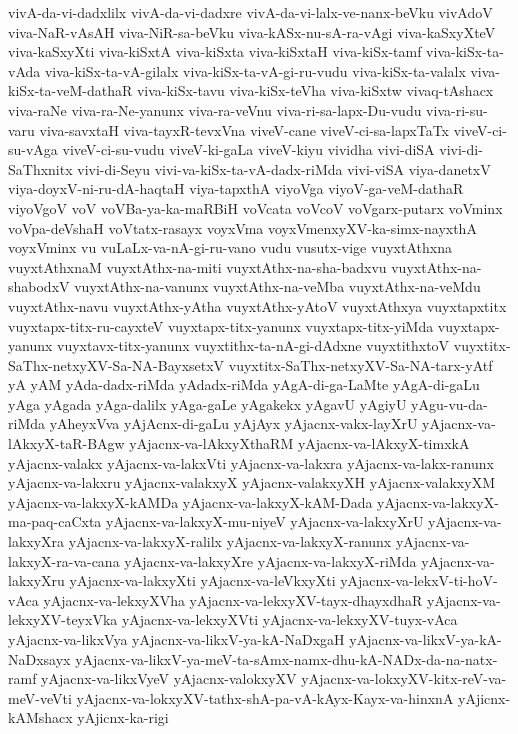 {vivA-da-vi-dadxlilx
vivA-da-vi-dadxre
vivA-da-vi-lalx-ve-nanx-beVku
vivAdoV
viva-NaR-vAsAH
viva-NiR-sa-beVku
viva-kASx-nu-sA-ra-vAgi
viva-kaSxyXteV
viva-kaSxyXti
viva-kiSxtA
viva-kiSxta
viva-kiSxtaH
viva-kiSx-tamf
viva-kiSx-ta-vAda
viva-kiSx-ta-vA-gilalx
viva-kiSx-ta-vA-gi-ru-vudu
viva-kiSx-ta-valalx
viva-kiSx-ta-veM-dathaR
viva-kiSx-tavu
viva-kiSx-teVha
viva-kiSxtw
vivaq-tAshacx
viva-raNe
viva-ra-Ne-yanunx
viva-ra-veVnu
viva-ri-sa-lapx-Du-vudu
viva-ri-su-varu
viva-savxtaH
viva-tayxR-tevxVna
viveV-cane
viveV-ci-sa-lapxTaTx
viveV-ci-su-vAga
viveV-ci-su-vudu
viveV-ki-gaLa
viveV-kiyu
vividha
vivi-diSA
vivi-di-SaThxnitx
vivi-di-Seyu
vivi-va-kiSx-ta-vA-dadx-riMda
vivi-viSA
viya-danetxV
viya-doyxV-ni-ru-dA-haqtaH
viya-tapxthA
viyoVga
viyoV-ga-veM-dathaR
viyoVgoV
voV
voVBa-ya-ka-maRBiH
voVcata
voVcoV
voVgarx-putarx
voVminx
voVpa-deVshaH
voVtatx-rasayx
voyxVma
voyxVmenxyXV-ka-simx-nayxthA
voyxVminx
vu
vuLaLx-va-nA-gi-ru-vano
vudu
vusutx-vige
vuyxtAthxna
vuyxtAthxnaM
vuyxtAthx-na-miti
vuyxtAthx-na-sha-badxvu
vuyxtAthx-na-shabodxV
vuyxtAthx-na-vanunx
vuyxtAthx-na-veMba
vuyxtAthx-na-veMdu
vuyxtAthx-navu
vuyxtAthx-yAtha
vuyxtAthx-yAtoV
vuyxtAthxya
vuyxtapxtitx
vuyxtapx-titx-ru-cayxteV
vuyxtapx-titx-yanunx
vuyxtapx-titx-yiMda
vuyxtapx-yanunx
vuyxtavx-titx-yanunx
vuyxtithx-ta-nA-gi-dAdxne
vuyxtithxtoV
vuyxtitx-SaThx-netxyXV-Sa-NA-BayxsetxV
vuyxtitx-SaThx-netxyXV-Sa-NA-tarx-yAtf
yA
yAM
yAda-dadx-riMda
yAdadx-riMda
yAgA-di-ga-LaMte
yAgA-di-gaLu
yAga
yAgada
yAga-dalilx
yAga-gaLe
yAgakekx
yAgavU
yAgiyU
yAgu-vu-da-riMda
yAheyxVva
yAjAcnx-di-gaLu
yAjAyx
yAjacnx-vakx-layXrU
yAjacnx-va-lAkxyX-taR-BAgw
yAjacnx-va-lAkxyXthaRM
yAjacnx-va-lAkxyX-timxkA
yAjacnx-valakx
yAjacnx-va-lakxVti
yAjacnx-va-lakxra
yAjacnx-va-lakx-ranunx
yAjacnx-va-lakxru
yAjacnx-valakxyX
yAjacnx-valakxyXH
yAjacnx-valakxyXM
yAjacnx-va-lakxyX-kAMDa
yAjacnx-va-lakxyX-kAM-Dada
yAjacnx-va-lakxyX-ma-paq-caCxta
yAjacnx-va-lakxyX-mu-niyeV
yAjacnx-va-lakxyXrU
yAjacnx-va-lakxyXra
yAjacnx-va-lakxyX-ralilx
yAjacnx-va-lakxyX-ranunx
yAjacnx-va-lakxyX-ra-va-cana
yAjacnx-va-lakxyXre
yAjacnx-va-lakxyX-riMda
yAjacnx-va-lakxyXru
yAjacnx-va-lakxyXti
yAjacnx-va-leVkxyXti
yAjacnx-va-lekxV-ti-hoV-vAca
yAjacnx-va-lekxyXVha
yAjacnx-va-lekxyXV-tayx-dhayxdhaR
yAjacnx-va-lekxyXV-teyxVka
yAjacnx-va-lekxyXVti
yAjacnx-va-lekxyXV-tuyx-vAca
yAjacnx-va-likxVya
yAjacnx-va-likxV-ya-kA-NaDxgaH
yAjacnx-va-likxV-ya-kA-NaDxsayx
yAjacnx-va-likxV-ya-meV-ta-sAmx-namx-dhu-kA-NADx-da-na-natx-ramf
yAjacnx-va-likxVyeV
yAjacnx-valokxyXV
yAjacnx-va-lokxyXV-kitx-reV-va-meV-veVti
yAjacnx-va-lokxyXV-tathx-shA-pa-vA-kAyx-Kayx-va-hinxnA
yAjicnx-kAMshacx
yAjicnx-ka-rigi
}
